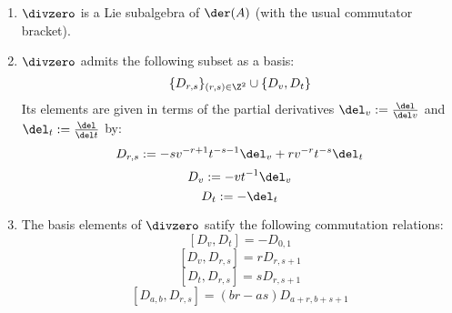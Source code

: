         \begin{lemma} \label{lemma: yangian_div_zero_vector_fields_basic_properties}
            \begin{enumerate}
                \item $\divzero$ is a Lie subalgebra of $\der(A)$ (with the usual commutator bracket).
                \item $\divzero$ admits the following subset as a basis:
                    $$\{D_{r, s}\}_{(r, s) \in \Z^2} \cup \{D_v, D_t\}$$
                Its elements are given in terms of the partial derivatives $\del_v := \frac{\del}{\del v}$ and $\del_t := \frac{\del}{\del t}$ by:
                    $$D_{r, s} := -s v^{-r + 1} t^{-s - 1} \del_v + r v^{-r} t^{-s} \del_t$$
                    $$D_v := -v t^{-1} \del_v$$
                    $$D_t := -\del_t$$
                \item The basis elements of $\divzero$ satify the following commutation relations:
                    $$[D_v, D_t] = -D_{0, 1}$$
                    $$[D_v, D_{r, s}] = r D_{r, s + 1}$$
                    $$[D_t, D_{r, s}] = s D_{r, s + 1}$$
                    $$[D_{a, b}, D_{r, s}] = (br - as) D_{a + r, b + s + 1}$$
            \end{enumerate}
        \end{lemma}
